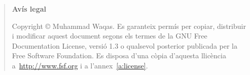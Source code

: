 \pagebreak

\vspace*{16truecm}

	\begin{quote}
	\textbf{Avís legal}

	  Copyright \copyright{}  Muhammad Waqas.
	  Es garanteix permís per copiar, distribuir i modificar aquest document segons els termes de la GNU Free Documentation License, versió 1.3 o qualsevol posterior publicada per la Free Software Foundation. Es disposa d'una còpia d'aquesta llicència a~\href{http://www.fsf.org}{http://www.fsf.org} i a l'annex~\ref{a:license}.
	\end{quote}	





\endinput
